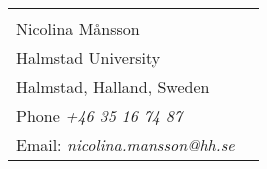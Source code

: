 \documentclass[margin,line]{resume}
\begin{document}
\begin{resume}

	\begin{tabular}{@{}p{6cm}p{6cm}}
		\textbf{}\\                          
		Nicolina Månsson\\
		Halmstad University\\                            
		Halmstad, Halland, Sweden\\
		Phone \textsl{+46 35 16 74 87}\\
		Email: \textsl{nicolina.mansson@hh.se}\\
	\end{tabular}
\end{resume}
\end{document}
